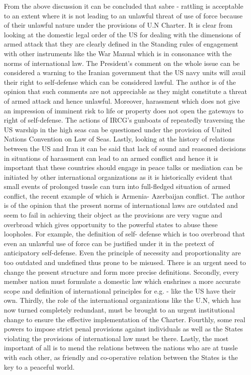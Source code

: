 \begin{multicols}{2}
\noi
From the above discussion it can be concluded that sabre - rattling is acceptable to an extent
where it is not leading to an unlawful threat of use of force because of their unlawful nature
under the provisions of U.N Charter. It is clear from looking at the domestic legal order of
the US for dealing with the dimensions of armed attack that they are clearly defined in the
Standing rules of engagement with other instruments like the War Manual which is in
consonance with the norms of international law. The President’s comment on the whole
issue can be considered a warning to the Iranian government that the US navy units will
avail their right to self-defense which can be considered lawful. The author is of the opinion
that such comments are not appreciable as they might constitute a threat of armed attack and
hence unlawful. Moreover, harassment which does not give an impression of imminent risk
to life or property does not open the gateways to right of self-defense. The actions of IRCG’s
gunboats of repeatedly traversing the US warship in the high seas can be questioned under
the provision of United Nations Convention on Law of Seas. Lastly, looking at the history
of relations between the US and Iran it can be said that lack of sound and reasoned decisions
in situations of harassment can lead to an armed conflict and hence it is important that these 
countries should engage in peace talks or mediation can be initiated by other international
organizations as it is historically evident that small events of prolonged tussle can turn into
full-fledged situation of armed conflict, the recent example of which is Armenia- Azerbaijan
conflict. The author is of the opinion that the present norms of international laws are
outdated and seem to fail in achieving their object as the provisions are very vague and
overbroad which gives opportunity to the powerful states to abuse these loopholes. For
example, the definition of self- defense which is too overbroad that even an unlawful use of
force can be justified under it in the pretext of anticipatory self-defense. Even the principle
of necessity and proportionality are too outdated and undefined thus prone to be misused.
There is an urgent need to change the present structure and form more precise definitions.
Secondly, every member nation must formulate a domestic law which enshrines a more
accurate scope and definition of international principles for e.g. - like the US have their
own. Thirdly, the role of the international organizations like the U.N, which has now turned
completely redundant, must be brought to an urgent institutional change to ensure the
effective implementation of the Charter. Fourthly, some real powers to impose strict penal
provisions against individuals as well as the States violating the provisions of international
law must be there. Lastly, the most important of all is to mend the relations between the
nations who are at tussle with each other, as friendly and co-operative relation between the
States is the key to a peaceful world.

\end{multicols}
\label{end2020-art7}
